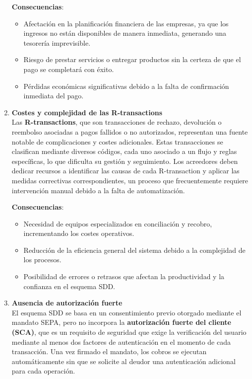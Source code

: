 \begin{enumerate}[label=\textbf{\arabic*.}, leftmargin=0.75cm]
        \textbf{Consecuencias}:
        \begin{itemize}
          \item Afectación en la planificación financiera de las empresas, ya que los ingresos no están disponibles de manera inmediata, generando una tesorería imprevisible.
          \item Riesgo de prestar servicios o entregar productos sin la certeza de que el pago se completará con éxito.
          \item Pérdidas económicas significativas debido a la falta de confirmación inmediata del pago.
        \end{itemize}

  \item \textbf{Costes y complejidad de las R-transactions}\\
        Las \textbf{R-transactions}, que son transacciones de rechazo, devolución o reembolso asociadas a pagos fallidos o no autorizados, representan una fuente notable de complicaciones y costes adicionales. Estas transacciones se clasifican mediante diversos códigos, cada uno asociado a un flujo y reglas específicas, lo que dificulta su gestión y seguimiento. Los acreedores deben dedicar recursos a identificar las causas de cada R-transaction y aplicar las medidas correctivas correspondientes, un proceso que frecuentemente requiere intervención manual debido a la falta de automatización.
        
        \textbf{Consecuencias}:
        \begin{itemize}
          \item Necesidad de equipos especializados en conciliación y recobro, incrementando los costes operativos.
          \item Reducción de la eficiencia general del sistema debido a la complejidad de los procesos.
          \item Posibilidad de errores o retrasos que afectan la productividad y la confianza en el esquema SDD.
        \end{itemize}

  \item \textbf{Ausencia de autorización fuerte}\\
        El esquema SDD se basa en un consentimiento previo otorgado mediante el mandato SEPA, pero no incorpora la \textbf{autorización fuerte del cliente (SCA)}, que es un requisito de seguridad que exige la verificación del usuario mediante al menos dos factores de autenticación \cite{EC_2018_RTS_SCA} en el momento de cada transacción. Una vez firmado el mandato, los cobros se ejecutan automáticamente sin que se solicite al deudor una autenticación adicional para cada operación.
        

\end{enumerate}
